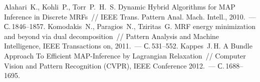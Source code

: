 \documentclass{article}
\begin{document}
\begin{thebibliography}{1}
    {Alahari~K., Kohli~P., Torr~P.~H.~S.}
    {Dynamic Hybrid Algorithms for MAP Inference in Discrete MRFs}~//
    {IEEE} Trans. Pattern Anal. Mach. Intell., 2010.~--- С.\,1846--1857.
    {Komodakis~N., Paragios~N., Tziritas~G.}
    {MRF energy minimization and beyond via dual decomposition}~//
    Pattern Analysis and Machine Intelligence, IEEE Transactions on, 2011.~--- С.\,531--552.
    {Kappes~J.\,H.}
    {A Bundle Approach To Efficient MAP-Inference by Lagrangian Relaxation}~//
    Computer Vision and Pattern Recognition (CVPR), IEEE Conference 2012.~--- С.\,1688--1695.
\end{thebibliography}
\end{document}
